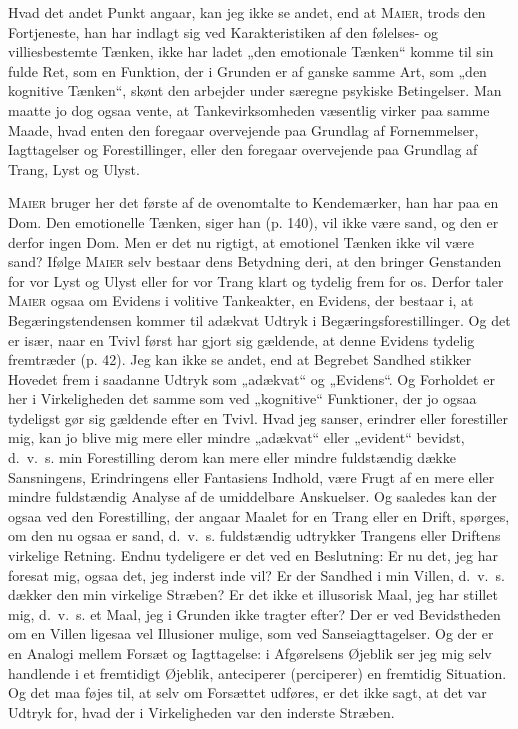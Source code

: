 \documentclass[12pt]{article}
\newcommand{\opage}[1]{\marginnote{\footnotesize\textit{[#1]}}}
\begin{document}
Hvad det andet Punkt angaar, kan jeg ikke se andet, end at \textsc{Maier}, trods den
Fortjeneste, han har indlagt sig ved Karakteristiken af den følelses- og villiesbestemte
Tænken, ikke har ladet „den emotionale Tænken“ komme til sin fulde Ret, som en
Funktion, der i Grunden er af ganske samme Art, som „den kognitive Tænken“,
skønt den arbejder under særegne psykiske Betingelser. Man maatte jo dog ogsaa
vente, at Tankevirksomheden væsentlig virker paa samme Maade, hvad enten den
foregaar overvejende paa Grundlag af Fornemmelser, Iagttagelser og Forestillinger,
eller den foregaar overvejende paa Grundlag af Trang, Lyst og Ulyst.

\textsc{Maier} bruger her det første af de ovenomtalte to Kendemærker, han har paa
\setcounter{footnote}{0}%
\opage{27}en Dom. Den emotionelle Tænken, siger han (p. 140), vil ikke være sand, og den
er derfor ingen Dom. Men er det nu rigtigt, at emotionel Tænken ikke vil være
sand? Ifølge \textsc{Maier} selv bestaar dens Betydning deri, at den bringer Genstanden
for vor Lyst og Ulyst eller for vor Trang klart og tydelig frem for os. Derfor taler
\textsc{Maier} ogsaa om Evidens i volitive Tankeakter, en Evidens, der bestaar i, at
Begæringstendensen kommer til adækvat Udtryk i Begæringsforestillinger. Og det er især,
naar en Tvivl først har gjort sig gældende, at denne Evidens tydelig fremtræder
(p. 42). Jeg kan ikke se andet, end at Begrebet Sandhed stikker Hovedet frem i
saadanne Udtryk som „adækvat“ og „Evidens“. Og Forholdet er her i Virkeligheden
det samme som ved „kognitive“ Funktioner, der jo ogsaa tydeligst gør sig
gældende efter en Tvivl. Hvad jeg sanser, erindrer eller forestiller mig, kan jo
blive mig mere eller mindre „adækvat“ eller „evident“ bevidst, d.~v.~s. min
Forestilling derom kan mere eller mindre fuldstændig dække Sansningens, Erindringens
eller Fantasiens Indhold, være Frugt af en mere eller mindre fuldstændig Analyse
af de umiddelbare Anskuelser. Og saaledes kan der ogsaa ved den Forestilling,
der angaar Maalet for en Trang eller en Drift, spørges, om den nu ogsaa er sand,
d.~v.~s. fuldstændig udtrykker Trangens eller Driftens virkelige Retning. Endnu
tydeligere er det ved en Beslutning: Er nu det, jeg har foresat mig, ogsaa det, jeg
inderst inde vil? Er der Sandhed i min Villen, d.~v.~s. dækker den min virkelige
Stræben? Er det ikke et illusorisk Maal, jeg har stillet mig, d.~v.~s. et Maal, jeg
i Grunden ikke tragter efter? Der er ved Bevidstheden om en Villen ligesaa vel
Illusioner mulige, som ved Sanseiagttagelser. Og der er en Analogi mellem Forsæt
og Iagttagelse: i Afgørelsens Øjeblik ser jeg mig selv handlende i et fremtidigt
Øjeblik, anteciperer (perciperer) en fremtidig Situation. Og det maa føjes til, at
selv om Forsættet udføres, er det ikke sagt, at det var Udtryk for, hvad der i
Virkeligheden var den inderste Stræben.
\end{document}
